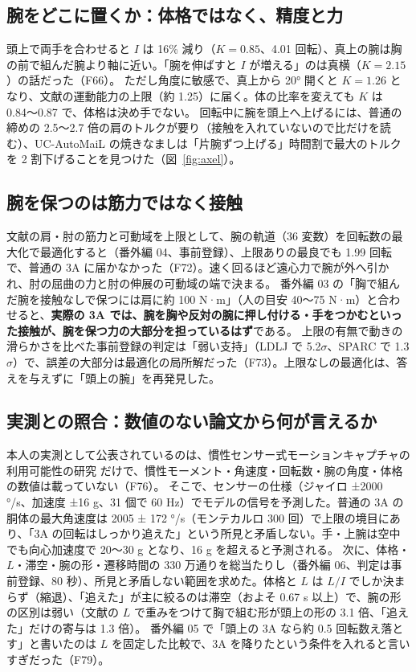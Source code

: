 \documentclass[paper=a4paper,fontsize=10pt,twocolumn,column_gap=2zw,line_length=24zw,number_of_lines=46,head_space=20mm]{jlreq}
\begin{document}
\subsection{腕をどこに置くか：体格ではなく、精度と力}
頭上で両手を合わせると $I$ は 16\% 減り（$K=0.85$、4.01 回転）、真上の腕は胸の前で組んだ腕より軸に近い。「腕を伸ばすと $I$ が増える」のは真横（$K=2.15$）の話だった（F66）。
ただし角度に敏感で、真上から 20° 開くと $K=1.26$ となり、文献の運動能力の上限（約 1.25）に届く。体の比率を変えても $K$ は 0.84〜0.87 で、体格は決め手でない。
回転中に腕を頭上へ上げるには、普通の締めの 2.5〜2.7 倍の肩のトルクが要り（接触を入れていないので比だけを読む）、UC-AutoMaiL の焼きなましは「片腕ずつ上げる」時間割で最大のトルクを 2 割下げることを見つけた（図~\ref{fig:axel}）。

\subsection{腕を保つのは筋力ではなく接触}
文献の肩・肘の筋力と可動域を上限として、腕の軌道（36 変数）を回転数の最大化で最適化すると（番外編 04、事前登録）、上限ありの最良でも 1.99 回転で、普通の 3A に届かなかった（F72）。速く回るほど遠心力で腕が外へ引かれ、肘の屈曲の力と肘の伸展の可動域の端で決まる。
番外編 03 の「胸で組んだ腕を接触なしで保つには肩に約 100 N·m」（人の目安 40〜75 N·m）と合わせると、\textbf{実際の 3A では、腕を胸や反対の腕に押し付ける・手をつかむといった接触が、腕を保つ力の大部分を担っているはず}である。
上限の有無で動きの滑らかさを比べた事前登録の判定は「弱い支持」（LDLJ で 5.2$\sigma$、SPARC で 1.3$\sigma$）で、誤差の大部分は最適化の局所解だった（F73）。上限なしの最適化は、答えを与えずに「頭上の腕」を再発見した。

\subsection{実測との照合：数値のない論文から何が言えるか}
本人の実測として公表されているのは、慣性センサー式モーションキャプチャの利用可能性の研究 \cite{hanyu2021} だけで、慣性モーメント・角速度・回転数・腕の角度・体格の数値は載っていない（F76）。
そこで、センサーの仕様（ジャイロ ±2000 °/s、加速度 ±16 g、31 個で 60 Hz）でモデルの信号を予測した。普通の 3A の胴体の最大角速度は 2005 ± 172 °/s（モンテカルロ 300 回）で上限の境目にあり、「3A の回転はしっかり追えた」という所見と矛盾しない。手・上腕は空中でも向心加速度で 20〜30 g となり、16 g を超えると予測される。
次に、体格・$L$・滞空・腕の形・遷移時間の 330 万通りを総当たりし（番外編 06、判定は事前登録、80 秒）、所見と矛盾しない範囲を求めた。体格と $L$ は $L/I$ でしか決まらず（縮退）、「追えた」が主に絞るのは滞空（およそ 0.67 s 以上）で、腕の形の区別は弱い（文献の $L$ で重みをつけて胸で組む形が頭上の形の 3.1 倍、「追えた」だけの寄与は 1.3 倍）。
番外編 05 で「頭上の 3A なら約 0.5 回転数え落とす」と書いたのは $L$ を固定した比較で、3A を降りたという条件を入れると言いすぎだった（F79）。
\end{document}
